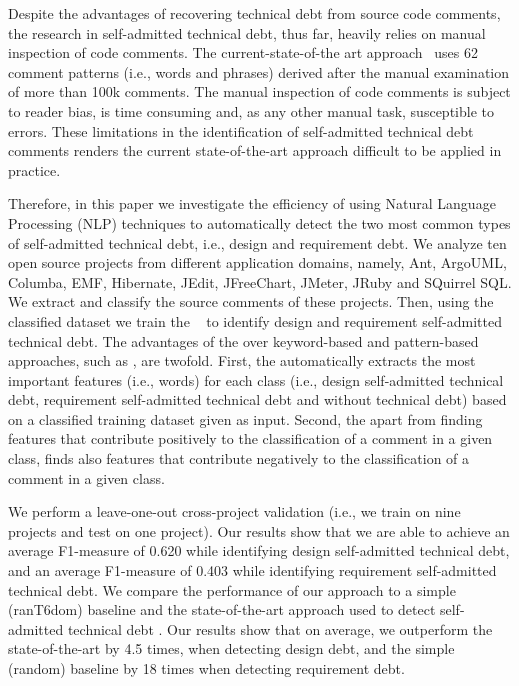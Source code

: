 \documentclass[10pt,journal,compsoc]{IEEEtran}
\newcommand{\SATD}{self-admitted technical debt\xspace}
\newcommand{\revised}[2]{\setlength{\marginparwidth}{1.2cm} \marginpar{\fbox{#2}}{\color{red}{#1}}}
\begin{document}
Despite the advantages of recovering technical debt from source code comments, the research in \SATD, thus far, heavily relies on manual inspection of code comments. The current-state-of-the art approach~\cite{Potdar2014ICSME} uses 62 comment patterns (i.e., words and phrases) derived after the manual examination of more than 100k comments. The manual inspection of code comments is subject to reader bias, is time consuming and, as any other manual task, susceptible to errors. These limitations in the identification of \SATD comments renders the current state-of-the-art approach difficult to be applied in practice.

Therefore, in this paper we investigate the efficiency of using Natural Language Processing (NLP) techniques to automatically detect the two most common types of \SATD, i.e., design and requirement debt. We analyze ten open source projects from different application domains, namely, Ant, ArgoUML, Columba, EMF, Hibernate, JEdit, JFreeChart, JMeter, JRuby and SQuirrel SQL. We extract and classify the source comments of these projects. Then, using the classified dataset we train the \revised{Stanford Classifier}{R2-11}~\cite{Manning2014ACL} to identify design and requirement \SATD.
The advantages of the \revised{maximum entropy classifier}{R2-11} over keyword-based and pattern-based approaches, such as\revised{comment patterns}{R2-1}, are twofold. First, the \revised{maximum entropy classifier}{R2-11} automatically extracts the most important features (i.e., words) for each class (i.e., design \SATD, requirement \SATD and without technical debt) based on a classified training dataset given as input. Second, the \revised{maximum entropy classifier}{R2-11} apart from finding features that contribute positively to the classification of a comment in a given class, finds also features that contribute negatively to the classification of a comment in a given class.

We perform a leave-one-out cross-project validation (i.e., we train on nine projects and test on one project). Our results show that we are able to  achieve an average F1-measure of 0.620 while identifying design \SATD, and an average F1-measure of 0.403 while identifying requirement \SATD. We compare the performance of our approach to a simple (ranT6dom) baseline and the state-of-the-art approach used to detect \SATD \revised{[citation removed]}{R2-1}. Our results show that on average, we outperform the state-of-the-art by 4.5 times, when detecting design debt, and the simple (random) baseline by 18 times when detecting requirement debt.
\end{document}
